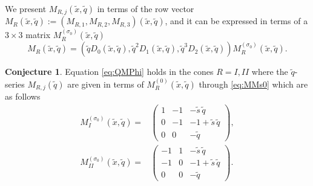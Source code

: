 \documentclass[12pt,reqno]{amsart}
\theoremstyle{definition}
\newtheorem{conjecture}[theorem]{Conjecture}
\def\s{\sigma}
\def\tq{\tilde{q}}
\def\tx{\tilde{x}}
\def\-{\,-\,}
\def\tx{\tilde{x}}
\def\ts{\tilde{s}}
\def\mf{\mathfrak}
\begin{document}
We present $M_{R,j}(\tx,\tq)$ in terms of the row vector
$M_R(\tx,\tq) := (M_{R,1},M_{R,2},M_{R,3})(\tx,\tq)$, and it can be expressed
in terms of a $3\times 3$ matrix $M^{(\s_0)}_R(\tx,\tq)$
\begin{equation}
  M_R(\tx,\tq)
  = \left(\tq D_0(\tx,\tq),\tq^2D_1(\tx,\tq),\tq^3D_2(\tx,\tq)\right)
  M^{(\s_0)}_R(\tx,\tq).
  \label{eq:MMs0}
\end{equation}
\begin{conjecture}
  Equation \eqref{eq:QMPhi} holds in the cones $R=I,II$ where the
  $\tq$-%
  series $M_{R,j}(\tq)$ are given in terms of $M_R^{(0)}(\tx,\tq)$ through
  \eqref{eq:MMs0} which are as follows
  \begin{subequations}
  \begin{align}
    M^{(\s_0)}_{I}(\tx,\tq) =
    &\begin{pmatrix}
       1&-1&-\ts\,\tq\\0&-1&-1+\ts\,\tq\\0&0&-\tq
     \end{pmatrix},\\
    M^{(\s_0)}_{II}(\tx,\tq) =
    &\begin{pmatrix}
       -1&1&-\ts\,\tq\\-1&0&-1+\ts\,\tq\\0&0&-\tq
     \end{pmatrix}.%
  \end{align}
\end{subequations}
\end{conjecture}

\end{document}
